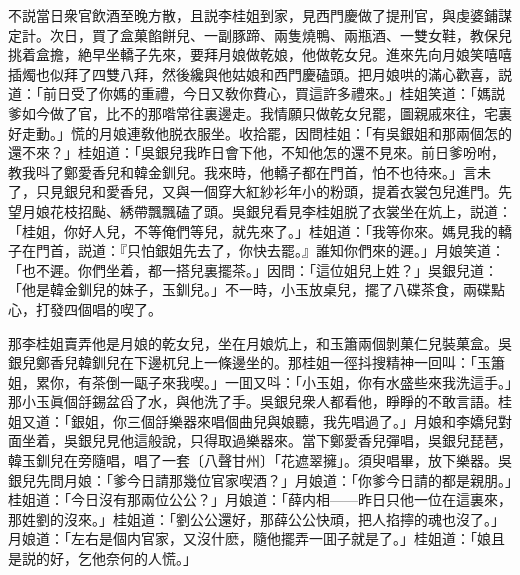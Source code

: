不説當日衆官飲酒至晚方散，且説李桂姐到家，見西門慶做了提刑官，與虔婆鋪謀定計。次日，買了盒菓餡餅兒、一副豚蹄、兩隻燒鴨、兩瓶酒、一雙女鞋，教保兒挑着盒擔，絶早坐轎子先來，要拜月娘做乾娘，他做乾女兒。進來先向月娘笑嘻嘻插燭也似拜了四雙八拜，然後纔與他姑娘和西門慶磕頭。把月娘哄的滿心歡喜，説道：「前日受了你媽的重禮，今日又敎你費心，買這許多禮來。」桂姐笑道：「媽説爹如今做了官，比不的那喒常往裏邊走。我情願只做乾女兒罷，圖親戚來往，宅裏好走動。」慌的月娘連敎他脱衣服坐。收拾罷，因問桂姐：「有吳銀姐和那兩個怎的還不來？」桂姐道：「吳銀兒我昨日會下他，不知他怎的還不見來。前日爹吩咐，教我呌了鄭愛香兒和韓金釧兒。我來時，他轎子都在門首，怕不也待來。」言未了，只見銀兒和愛香兒，又與一個穿大紅紗衫年小的粉頭，提着衣裳包兒進門。先望月娘花枝招颭、綉帶飄飄磕了頭。吳銀兒看見李桂姐脱了衣裳坐在炕上，説道：「桂姐，你好人兒，不等俺們等兒，就先來了。」桂姐道：「我等你來。媽見我的轎子在門首，説道：『只怕銀姐先去了，你快去罷。』誰知你們來的遲。」月娘笑道：「也不遲。你們坐着，都一搭兒裏擺茶。」因問：「這位姐兒上姓？」吳銀兒道：「他是韓金釧兒的妹子，玉釧兒。」不一時，小玉放桌兒，擺了八碟茶食，兩碟點心，打發四個唱的喫了。

那李桂姐賣弄他是月娘的乾女兒，坐在月娘炕上，和玉簫兩個剝菓仁兒裝菓盒。吳銀兒鄭香兒韓釧兒在下邊杌兒上一條邊坐的。那桂姐一徑抖搜精神一回叫：「玉簫姐，累你，有茶倒一甌子來我喫。」一囬又呌：「小玉姐，你有水盛些來我洗這手。」那小玉眞個㧱錫盆舀了水，與他洗了手。吳銀兒衆人都看他，睜睜的不敢言語。桂姐又道：「銀姐，你三個㧱樂器來唱個曲兒與娘聽，我先唱過了。」月娘和李嬌兒對面坐着，吳銀兒見他這般說，只得取過樂器來。當下鄭愛香兒彈唱，吳銀兒琵琶，韓玉釧兒在旁隨唱，唱了一套〔八聲甘州〕「花遮翠擁」。須臾唱畢，放下樂器。吳銀兒先問月娘：「爹今日請那幾位官家喫酒？」月娘道：「你爹今日請的都是親朋。」桂姐道：「今日沒有那兩位公公？」月娘道：「薛内相——昨日只他一位在這裏來，那姓劉的沒來。」桂姐道：「劉公公還好，那薛公公快頑，把人掐擰的魂也沒了。」月娘道：「左右是個内官家，又沒什麽，隨他擺弄一囬子就是了。」桂姐道：「娘且是説的好，乞他奈何的人慌。」

